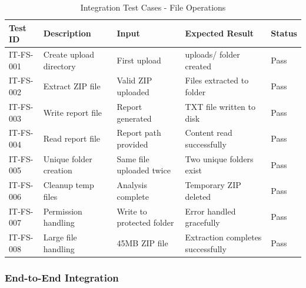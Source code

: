 \documentclass[12pt,a4paper]{article}
\begin{document}
    \begin{table}[H]
        \caption{Integration Test Cases - File Operations}
        \begin{tabular}{|p{2cm}|p{4cm}|p{3cm}|p{3cm}|p{1.5cm}|}
            \hline
            \textbf{Test ID} & \textbf{Description} & \textbf{Input} & \textbf{Expected Result} & \textbf{Status} \\
            \hline
            IT-FS-001 & Create upload directory & First upload & uploads/ folder created & Pass \\
            \hline
            IT-FS-002 & Extract ZIP file & Valid ZIP uploaded & Files extracted to folder & Pass \\
            \hline
            IT-FS-003 & Write report file & Report generated & TXT file written to disk & Pass \\
            \hline
            IT-FS-004 & Read report file & Report path provided & Content read successfully & Pass \\
            \hline
            IT-FS-005 & Unique folder creation & Same file uploaded twice & Two unique folders exist & Pass \\
            \hline
            IT-FS-006 & Cleanup temp files & Analysis complete & Temporary ZIP deleted & Pass \\
            \hline
            IT-FS-007 & Permission handling & Write to protected folder & Error handled gracefully & Pass \\
            \hline
            IT-FS-008 & Large file handling & 45MB ZIP file & Extraction completes successfully & Pass \\
            \hline
        \end{tabular}
    \end{table}

    \subsubsection{End-to-End Integration}
\end{document}

